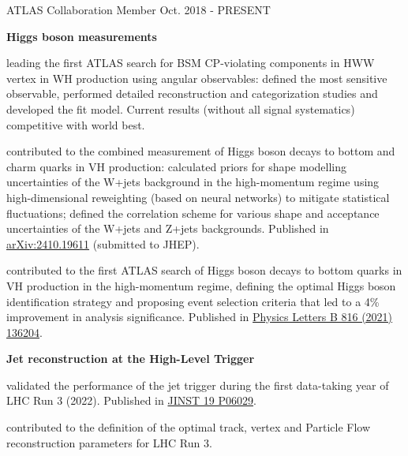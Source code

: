 \begin{cventries}
    \cventry
    {ATLAS Collaboration}
    {Member}
    {}
    {Oct. 2018 - PRESENT}
    {
        \textbf{Higgs boson measurements}\vspace{14pt}
        \begin{cvitems}
            \item {leading the first ATLAS search for BSM CP-violating components in HWW vertex in WH production using angular observables: defined the most sensitive observable, performed detailed reconstruction and categorization studies and developed the fit model. Current results (without all signal systematics) competitive with world best.}
            \item {contributed to the combined measurement of Higgs boson decays to bottom and charm quarks in VH production: calculated priors for shape modelling uncertainties of the W+jets background in the high-momentum regime using high-dimensional reweighting (based on neural networks) to mitigate statistical fluctuations; defined the correlation scheme for various shape and acceptance uncertainties of the W+jets and Z+jets backgrounds. Published in \href{https://arxiv.org/abs/2410.19611}{arXiv:2410.19611} (submitted to JHEP).}
            \item {contributed to the first ATLAS search of Higgs boson decays to bottom quarks in VH production in the high-momentum regime, defining the optimal Higgs boson identification strategy and proposing event selection criteria that led to a 4\% improvement in analysis significance. Published in \href{https://doi.org/10.1016/j.physletb.2021.136204}{Physics Letters B 816 (2021) 136204}.}
        \end{cvitems}\vspace{19pt}
        \textbf{Jet reconstruction at the High-Level Trigger}\vspace{14pt}
        \begin{cvitems}
            \item {validated the performance of the jet trigger during the first data-taking year of LHC Run 3 (2022). Published in \href{https://doi.org/10.1088/1748-0221/19/06/P06029}{JINST 19 P06029}.}
            \item {contributed to the definition of the optimal track, vertex and Particle Flow reconstruction parameters for LHC Run 3.}
        \end{cvitems}
    }

\end{cventries}